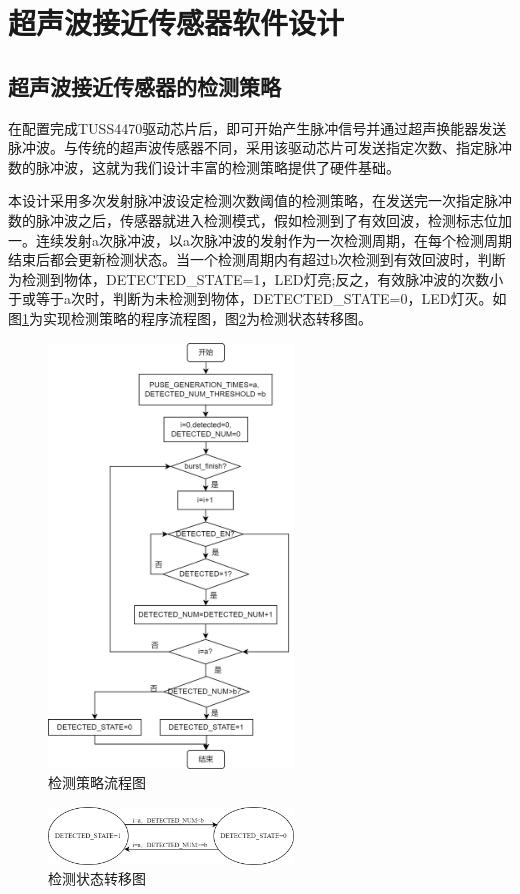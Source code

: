 \newpage
\section{超声波接近传感器软件设计}
\subsection{超声波接近传感器的检测策略}
在配置完成TUSS4470驱动芯片后，即可开始产生脉冲信号并通过超声换能器发送脉冲波。与传统的超声波传感器不同，采用该驱动芯片可发送指定次数、指定脉冲数的脉冲波，这就为我们设计丰富的检测策略提供了硬件基础。\par

本设计采用多次发射脉冲波设定检测次数阈值的检测策略，在发送完一次指定脉冲数的脉冲波之后，传感器就进入检测模式，假如检测到了有效回波，检测标志位加一。连续发射a次脉冲波，以a次脉冲波的发射作为一次检测周期，在每个检测周期结束后都会更新检测状态。当一个检测周期内有超过b次检测到有效回波时，判断为检测到物体，DETECTED\_STATE=1，LED灯亮;反之，有效脉冲波的次数小于或等于a次时，判断为未检测到物体，DETECTED\_STATE=0，LED灯灭。如图\ref{检测策略流程图}为实现检测策略的程序流程图，图\ref{检测状态转移图}为检测状态转移图。
\begin{figure}[!h]
	\centering
	\includegraphics[width=6.5cm]{figure/detection logic.png}
	\caption{检测策略流程图}
	\label{检测策略流程图}%
\end{figure}
\begin{figure}[!h]
	\centering
	\includegraphics[width=6.5cm]{figure/LED state transition diagram.png}
	\caption{检测状态转移图}
	\label{检测状态转移图}%
\end{figure}\par

